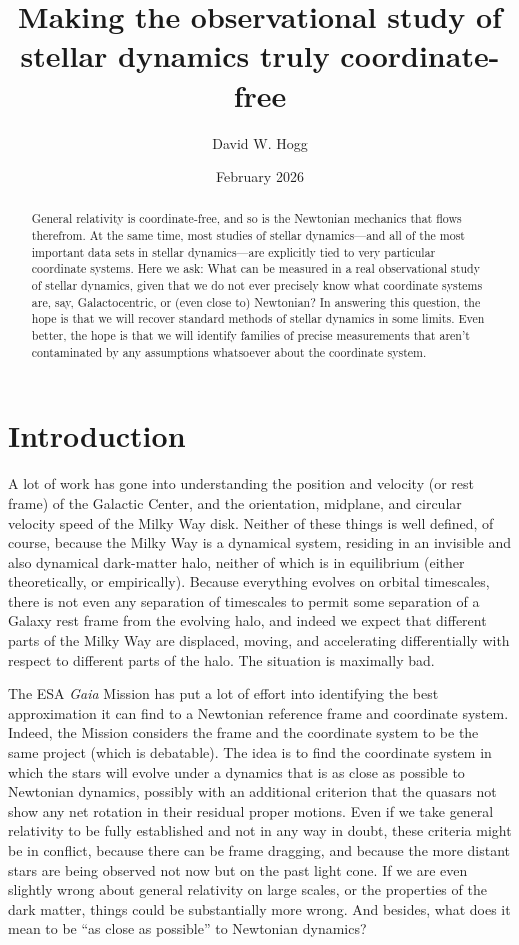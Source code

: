 \documentclass{article}
\title{\bfseries Making the observational study of stellar dynamics truly coordinate-free}
\author{David W. Hogg}
\date{February 2026}
\begin{document}
\maketitle

\begin{abstract}\noindent
    General relativity is coordinate-free, and so is the Newtonian mechanics that flows therefrom.
    At the same time, most studies of stellar dynamics---and all of the most important data sets in stellar dynamics---are explicitly tied to very particular coordinate systems.
    Here we ask: What can be measured in a real observational study of stellar dynamics, given that we do not ever precisely know what coordinate systems are, say, Galactocentric, or (even close to) Newtonian?
    In answering this question, the hope is that we will recover standard methods of stellar dynamics in some limits.
    Even better, the hope is that we will identify families of precise measurements that aren't contaminated by any assumptions whatsoever about the coordinate system.
\end{abstract}

\section{Introduction}
A lot of work has gone into understanding the position and velocity (or rest frame) of the Galactic Center, and the orientation, midplane, and circular velocity speed of the Milky Way disk.
Neither of these things is well defined, of course, because the Milky Way is a dynamical system, residing in an invisible and also dynamical dark-matter halo, neither of which is in equilibrium (either theoretically, or empirically).
Because everything evolves on orbital timescales, there is not even any separation of timescales to permit some separation of a Galaxy rest frame from the evolving halo, and indeed we expect that different parts of the Milky Way are displaced, moving, and accelerating differentially with respect to different parts of the halo.
The situation is maximally bad.

The ESA \textsl{Gaia} Mission has put a lot of effort into identifying the best approximation it can find to a Newtonian reference frame and coordinate system.
Indeed, the Mission considers the frame and the coordinate system to be the same project (which is debatable).
The idea is to find the coordinate system in which the stars will evolve under a dynamics that is as close as possible to Newtonian dynamics, possibly with an additional criterion that the quasars not show any net rotation in their residual proper motions.
Even if we take general relativity to be fully established and not in any way in doubt, these criteria might be in conflict, because there can be frame dragging, and because the more distant stars are being observed not now but on the past light cone.
If we are even slightly wrong about general relativity on large scales, or the properties of the dark matter, things could be substantially more wrong.
And besides, what does it mean to be ``as close as possible'' to Newtonian dynamics?
\end{document}
